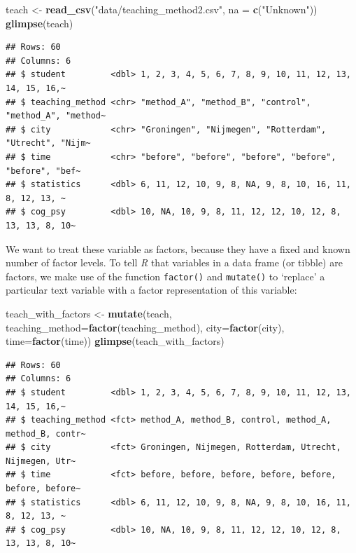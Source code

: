 \documentclass[
]{scrartcl}
\newenvironment{Shaded}{\begin{snugshade}}{\end{snugshade}}
\newcommand{\DataTypeTok}[1]{\textcolor[rgb]{0.13,0.29,0.53}{#1}}
\newcommand{\KeywordTok}[1]{\textcolor[rgb]{0.13,0.29,0.53}{\textbf{#1}}}
\newcommand{\NormalTok}[1]{#1}
\newcommand{\StringTok}[1]{\textcolor[rgb]{0.31,0.60,0.02}{#1}}
\begin{document}
\begin{Shaded}
\begin{Highlighting}[]
\NormalTok{teach \textless{}{-}}\StringTok{ }\KeywordTok{read\_csv}\NormalTok{(}\StringTok{"data/teaching\_method2.csv"}\NormalTok{, }\DataTypeTok{na =} \KeywordTok{c}\NormalTok{(}\StringTok{"Unknown"}\NormalTok{))}
\KeywordTok{glimpse}\NormalTok{(teach)}
\end{Highlighting}
\end{Shaded}

\begin{verbatim}
## Rows: 60
## Columns: 6
## $ student         <dbl> 1, 2, 3, 4, 5, 6, 7, 8, 9, 10, 11, 12, 13, 14, 15, 16,~
## $ teaching_method <chr> "method_A", "method_B", "control", "method_A", "method~
## $ city            <chr> "Groningen", "Nijmegen", "Rotterdam", "Utrecht", "Nijm~
## $ time            <chr> "before", "before", "before", "before", "before", "bef~
## $ statistics      <dbl> 6, 11, 12, 10, 9, 8, NA, 9, 8, 10, 16, 11, 8, 12, 13, ~
## $ cog_psy         <dbl> 10, NA, 10, 9, 8, 11, 12, 12, 10, 12, 8, 13, 13, 8, 10~
\end{verbatim}

We want to treat these variable as factors, because they have a fixed and known number of factor levels. To tell \emph{R} that variables in a data frame (or tibble) are factors, we make use of the function \texttt{factor()} and \texttt{mutate()} to `replace' a particular text variable with a factor representation of this variable:

\begin{Shaded}
\begin{Highlighting}[]
\NormalTok{teach\_with\_factors \textless{}{-}}\StringTok{ }\KeywordTok{mutate}\NormalTok{(teach,}
                       \DataTypeTok{teaching\_method=}\KeywordTok{factor}\NormalTok{(teaching\_method),}
                       \DataTypeTok{city=}\KeywordTok{factor}\NormalTok{(city),}
                       \DataTypeTok{time=}\KeywordTok{factor}\NormalTok{(time))}
\KeywordTok{glimpse}\NormalTok{(teach\_with\_factors)}
\end{Highlighting}
\end{Shaded}

\begin{verbatim}
## Rows: 60
## Columns: 6
## $ student         <dbl> 1, 2, 3, 4, 5, 6, 7, 8, 9, 10, 11, 12, 13, 14, 15, 16,~
## $ teaching_method <fct> method_A, method_B, control, method_A, method_B, contr~
## $ city            <fct> Groningen, Nijmegen, Rotterdam, Utrecht, Nijmegen, Utr~
## $ time            <fct> before, before, before, before, before, before, before~
## $ statistics      <dbl> 6, 11, 12, 10, 9, 8, NA, 9, 8, 10, 16, 11, 8, 12, 13, ~
## $ cog_psy         <dbl> 10, NA, 10, 9, 8, 11, 12, 12, 10, 12, 8, 13, 13, 8, 10~
\end{verbatim}
\end{document}
